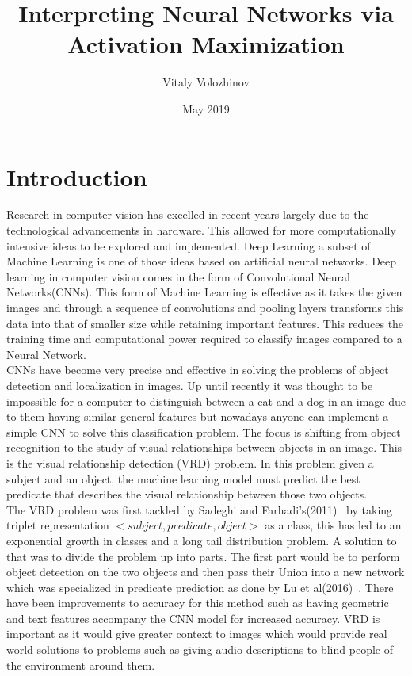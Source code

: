 \documentclass{csfyp}
\title{Interpreting Neural Networks via Activation Maximization}
\author{Vitaly Volozhinov}
\date{May 2019}
\newcommand\tab[1][1cm]{\hspace*{#1}}
\begin{document}
\tableofcontents


\setcounter{page}{1}
\newpage

\section{Introduction}
\label{s:intro}
\tab
Research in computer vision has excelled in recent years largely due to the technological advancements in hardware. This allowed for more computationally intensive ideas to be explored and implemented. Deep Learning a subset of Machine Learning is one of those ideas based on artificial neural networks. Deep learning in computer vision comes in the form of Convolutional Neural Networks(CNNs). This form of Machine Learning is effective as it takes the given images and through a sequence of convolutions and pooling layers transforms this data into that of smaller size while retaining important features. This reduces the training time and computational power required to classify images compared to a Neural Network.
\\
\tab
CNNs have become very precise and effective in solving the problems of object detection and localization in images. Up until recently it was thought to be impossible for a computer to distinguish between a cat and a dog in an image due to them having similar general features but nowadays anyone can implement a simple CNN to solve this classification problem. The focus is shifting from object recognition to the study of visual relationships between objects in an image. This is the visual relationship detection (VRD) problem. In this problem given a subject and an object, the machine learning model must predict the best predicate that describes the visual relationship between those two objects. 
\\
\tab
The VRD problem was first tackled by Sadeghi and Farhadi’s(2011)~\cite{VisualPhrases} by taking triplet representation $< subject, predicate, object >$ as a class, this has led to an exponential growth in classes and a long tail distribution problem. A solution to that was to divide the problem up into parts. The first part would be to perform object detection on the two objects and then pass their Union into a new network which was specialized in predicate prediction as done by Lu et al(2016)~\cite{lu2016visual}.
There have been improvements to accuracy for this method such as having geometric and text features accompany the CNN model for increased accuracy. VRD is important as it would give greater context to images which would provide real world solutions to problems such as giving audio descriptions to blind people of the environment around them.
\end{document}
